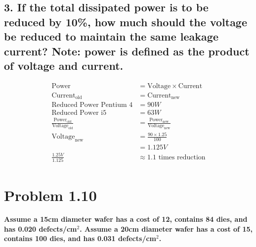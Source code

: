 \documentclass[11pt]{article}
\begin{document}
\subsection*{\small 3. If the total dissipated power is to be reduced by 10\%, how much should the voltage be reduced to maintain the same leakage current? Note: power is defined as the product of voltage and current.}
\begin{align*}
\textrm{Power} & = \textrm{Voltage} \times \textrm{Current}\\
\textrm{Current}_{\textrm{old}} & = \textrm{Current}_{\textrm{new}}\\
\textrm{Reduced Power Pentium 4} & = 90W\\
\textrm{Reduced Power i5} & = 63W\\
\frac{\textrm{Power}_{\textrm{old}}}{\textrm{Voltage}_{\textrm{old}}} & = \frac{\textrm{Power}_{\textrm{new}}}{\textrm{Voltage}_{\textrm{new}}}\\
\textrm{Voltage}_{\textrm{new}} & = \frac{90 \times 1.25}{100}\\
& = 1.125V\\
\frac{1.25V}{1.125} & \approx \boldsymbol{1.1} \textrm{ times reduction}\\
\end{align*}
\section*{Problem 1.10}
\textbf{Assume a 15cm diameter wafer has a cost of 12, contains 84 dies, and has 0.020 defects/cm$^2$. Assume a 20cm diameter wafer has a cost of 15, contains 100 dies, and has 0.031 defects/cm$^2$.}
\end{document}
